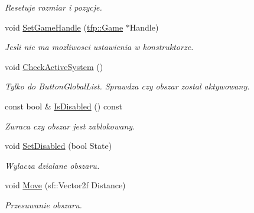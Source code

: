 \begin{DoxyCompactItemize}
\begin{DoxyCompactList}\small\item\em Resetuje rozmiar i pozycje. \end{DoxyCompactList}\item 
\mbox{\label{classtfp_1_1_clickable_area_ad2384603fab60ebb57c9f07d81885294}} 
void \mbox{\hyperlink{classtfp_1_1_clickable_area_ad2384603fab60ebb57c9f07d81885294}{Set\+Game\+Handle}} (\mbox{\hyperlink{classtfp_1_1_game}{tfp\+::\+Game}} $\ast$Handle)
\begin{DoxyCompactList}\small\item\em Jesli nie ma mozliwosci ustawienia w konstruktorze. \end{DoxyCompactList}\item 
void \mbox{\hyperlink{classtfp_1_1_clickable_area_afeeaa98f916febd990f3a382612c8e34}{Check\+Active\+System}} ()
\begin{DoxyCompactList}\small\item\em Tylko do Button\+Global\+List. Sprawdza czy obszar zostal aktywowany. \end{DoxyCompactList}\item 
\mbox{\label{classtfp_1_1_clickable_area_a318bfa23da7f0dd58489219e38663c0a}} 
const bool \& \mbox{\hyperlink{classtfp_1_1_clickable_area_a318bfa23da7f0dd58489219e38663c0a}{Is\+Disabled}} () const
\begin{DoxyCompactList}\small\item\em Zwraca czy obszar jest zablokowany. \end{DoxyCompactList}\item 
\mbox{\label{classtfp_1_1_clickable_area_a102396d3a1af3a9f969f463b8b4b02e6}} 
void \mbox{\hyperlink{classtfp_1_1_clickable_area_a102396d3a1af3a9f969f463b8b4b02e6}{Set\+Disabled}} (bool State)
\begin{DoxyCompactList}\small\item\em Wylacza dzialane obszaru. \end{DoxyCompactList}\item 
\mbox{\label{classtfp_1_1_clickable_area_a8112c2b80c5f0c87064037c7e545c8c2}} 
void \mbox{\hyperlink{classtfp_1_1_clickable_area_a8112c2b80c5f0c87064037c7e545c8c2}{Move}} (sf\+::\+Vector2f Distance)
\begin{DoxyCompactList}\small\item\em Przesuwanie obszaru. \end{DoxyCompactList}\item 

\end{DoxyCompactItemize}
